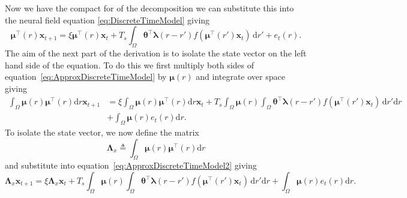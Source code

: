 \documentclass[review,authoryear,3p]{elsarticle}
\begin{document}
% 
Now we have the compact for of the decomposition we can substitute this into the neural field equation \eqref{eq:DiscreteTimeModel} giving
\begin{equation}\label{eq:ApproxDiscreteTimeModel}
	\boldsymbol\mu^\top\left(r\right)\mathbf{x}_{t+1} = 
	\xi \boldsymbol\mu^\top\left(r\right)\mathbf{x}_t + 
	T_s \int_\Omega { 
	    \boldsymbol\theta^\top\boldsymbol\lambda\left(r-r'\right)
	    f\left(\boldsymbol\mu^\top\left(r'\right)\mathbf{x}_t\right) 
	\, \mathrm{d}r'}  
	+ e_t\left(r\right).
\end{equation}
The aim of the next part of the derivation is to isolate the state vector on the left hand side of the equation. To do this we first multiply both sides of equation~\eqref{eq:ApproxDiscreteTimeModel} by $\boldsymbol\mu\left(r\right)$ and integrate over space giving 
\begin{align}\label{eq:ApproxDiscreteTimeModel2}
	\int_{\Omega} \boldsymbol\mu\left(r\right)\boldsymbol\mu^\top\left(r\right) \mathrm{d}r \mathbf{x}_{t+1} &= 
	\xi \int_{\Omega}\boldsymbol\mu\left(r\right)\boldsymbol\mu^\top\left(r\right) \mathrm{d}r \mathbf{x}_t + 
	T_s \int_{\Omega}\boldsymbol\mu\left(r\right)\int_\Omega { 
	    \boldsymbol\theta^\top\boldsymbol\lambda\left(r-r'\right)
	    f\left(\boldsymbol\mu^\top\left(r'\right)\mathbf{x}_t\right) 
	\, \mathrm{d}r'\mathrm{d}r}  \nonumber\\
	&+ \int_{\Omega}\boldsymbol\mu\left(r\right)e_t\left(r\right)\mathrm{d}r.
\end{align}
To isolate the state vector, we now define the matrix 
\begin{equation}
	\label{eq:Lambdax}
	 \mathbf{\Lambda}_{x} \triangleq \int_{\Omega}\boldsymbol{\mu}\left(r\right)\boldsymbol{\mu}^\top\left(r\right) \mathrm{d}r
\end{equation}
and substitute into equation~\eqref{eq:ApproxDiscreteTimeModel2} giving
\begin{equation}\label{eq:ApproxDiscreteTimeModel3}
	\mathbf{\Lambda}_{x} \mathbf{x}_{t+1} = 
	\xi \mathbf{\Lambda}_{x} \mathbf{x}_t + 
	T_s \int_{\Omega}\boldsymbol\mu\left(r\right)\int_\Omega { 
	    \boldsymbol\theta^\top\boldsymbol\lambda\left(r-r'\right)
	    f\left(\boldsymbol\mu^\top\left(r'\right)\mathbf{x}_t\right) 
	\, \mathrm{d}r'\mathrm{d}r}  
	+ \int_{\Omega}\boldsymbol{\mu}\left(r\right) e_t\left(r\right) \mathrm{d}r.
\end{equation}
\end{document}
